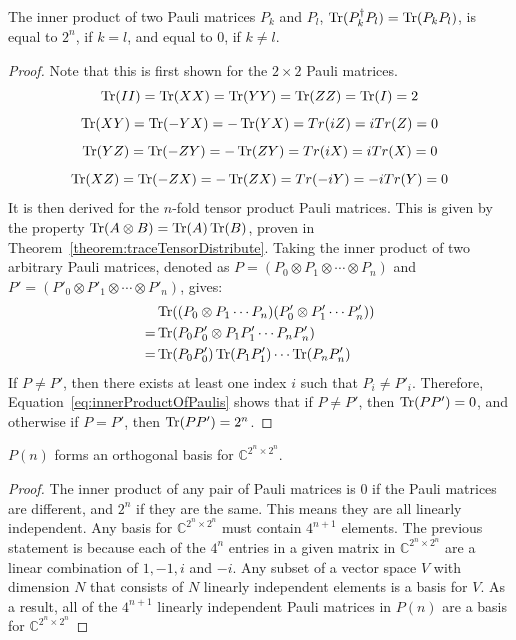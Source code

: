\begin{theorem}
\label{theorem:innerProductPaulis}
The inner product of two Pauli matrices $P_k$ and $P_l$, $\operatorname{Tr} (P_k^{\dagger} P_l) = \operatorname{Tr} (P_k P_l)$, is equal to $2^n$, if $k=l$, and equal to $0$, if $k\neq l$.
\end{theorem}
\begin{proof}
Note that this is first shown for the $2\times 2$ Pauli matrices.
$$
\operatorname{Tr}(II) = \operatorname{Tr}(XX) = \operatorname{Tr}(YY) = \operatorname{Tr}(ZZ) = \operatorname{Tr}(I) = 2
$$
$$
\operatorname{Tr}(XY) = \operatorname{Tr}(-YX) = -\operatorname{Tr}(YX) = Tr(iZ) = iTr(Z) = 0
$$
$$
\operatorname{Tr}(YZ) = \operatorname{Tr}(-ZY) = -\operatorname{Tr}(ZY) = Tr(iX) = iTr(X) = 0
$$
$$
\operatorname{Tr}(XZ) = \operatorname{Tr}(-ZX) = -\operatorname{Tr}(ZX) = Tr(-iY) = -iTr(Y) = 0
$$
It is then derived for the $n$-fold tensor product Pauli matrices. This is given by the property $\operatorname{Tr}(A \otimes B) = \operatorname{Tr}(A)\operatorname{Tr}(B)$, proven in Theorem~\ref{theorem:traceTensorDistribute}. Taking the inner product of two arbitrary Pauli matrices, denoted as $P = (P_0 \otimes P_1 \otimes \cdots \otimes P_n)$ and $P' = (P'_0 \otimes P'_1 \otimes \cdots \otimes P'_n)$, gives:
\begin{align}
&\operatorname{Tr}((P_0 \otimes P_1 \cdots P_n)(P'_0 \otimes P'_1 \cdots P'_n))\\
=&\operatorname{Tr}(P_0P'_0 \otimes P_1P'_1 \cdots P_nP'_n)\\
=&\operatorname{Tr}(P_0P'_0)\operatorname{Tr}(P_1P'_1) \cdots \operatorname{Tr}(P_nP'_n) \label{eq:innerProductOfPaulis}
\end{align}
If $P \neq P'$, then there exists at least one index $i$ such that $P_i \neq P'_i$. Therefore, Equation~\eqref{eq:innerProductOfPaulis} shows that if $P \neq P'$, then $\operatorname{Tr}(PP') = 0$, and otherwise if $P = P'$, then $\operatorname{Tr}(PP') = 2^n$.
\end{proof}

\begin{corollary}
\label{corollary:paulisFormBasis}
$P(n)$ forms an orthogonal basis for $\mathbb{C}^{2^n \times 2^n}$.
\end{corollary}
\begin{proof}
The inner product of any pair of Pauli matrices is $0$ if the Pauli matrices are different, and $2^n$ if they are the same. This means they are all linearly independent. Any basis for $\mathbb{C}^{2^n \times 2^n}$ must contain $4^{n+1}$ elements. The previous statement is because each of the $4^n$ entries in a given matrix in $\mathbb{C}^{2^n \times 2^n}$ are a linear combination of $1, -1, i$ and $-i$.  Any subset of a vector space $V$ with dimension $N$ that consists of $N$ linearly independent elements is a basis for $V$. As a result, all of the $4^{n+1}$ linearly independent Pauli matrices in $P(n)$ are a basis for $\mathbb{C}^{2^n \times 2^n}$ 
\end{proof}

